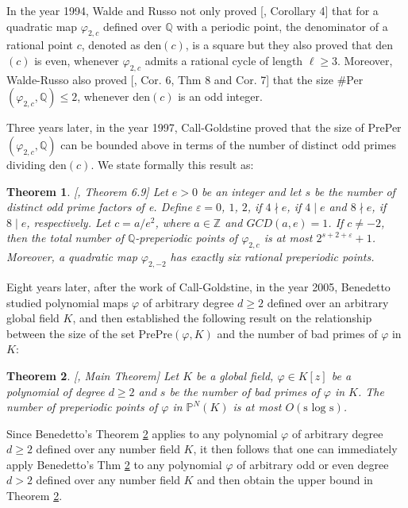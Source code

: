 \documentclass{article}
\theoremstyle{plain}
\newtheorem{thm}{Theorem}[section]
\theoremstyle{definition}
\begin{document}
In the year 1994, Walde and Russo not only proved [\cite{Russo}, Corollary 4] that for a quadratic map $\varphi_{2,c}$ defined over $\mathbb{Q}$ with a periodic point, the denominator of a rational point $c$, denoted as den$(c)$, is a square but they also proved that den$(c)$ is even, whenever $\varphi_{2,c}$ admits a rational cycle of length $\ell \geq 3$. Moreover, Walde-Russo also proved [\cite{Russo}, Cor. 6, Thm 8 and Cor. 7] that the size \#Per$(\varphi_{2, c}, \mathbb{Q})\leq 2$, whenever den$(c)$ is an odd integer. 

Three years later, in the year 1997, Call-Goldstine \cite{Call} proved that the size of PrePer$(\varphi_{2,c},\mathbb{Q})$ can be bounded above in terms of the number of distinct odd primes dividing den$(c)$. We state formally this result as:

\begin{thm}\label{2.3.1}[\cite{Call}, Theorem 6.9]
Let $e>0$ be an integer and let $s$ be the number of distinct odd prime factors of e. Define $\varepsilon  = 0$, $1$, $2$, if $4\nmid e$, if $4\mid e$ and $8 \nmid e$, if $8 \mid e$, respectively. Let $c = a/e^2$, where $a\in \mathbb{Z}$ and $GCD(a, e) = 1$. If $c \neq -2$, then the total number of $\mathbb{Q}$-preperiodic points of $\varphi_{2, c}$ is at most $2^{s + 2 + \varepsilon} + 1$. Moreover, a quadratic map $\varphi_{2, -2}$ has exactly six rational preperiodic points.
\end{thm}

Eight years later, after the work of Call-Goldstine, in the year 2005, Benedetto \cite{detto} studied polynomial maps $\varphi$ of arbitrary degree $d\geq 2$ defined over an arbitrary global field $K$, and then established the following result on the relationship between the size of the set PrePre$(\varphi, K)$ and the number of bad primes of $\varphi$ in $K$:

\begin{thm}\label{main} [\cite{detto}, Main Theorem]
Let $K$ be a global field, $\varphi\in K[z]$ be a polynomial of degree $d\geq 2$ and $s$ be the number of bad primes of $\varphi$ in $K$. The number of preperiodic points of $\varphi$ in $\mathbb{P}^N(K)$ is at most $O(\text{s log s})$. 
\end{thm}

 
\noindent Since Benedetto's Theorem \ref{main} applies to any polynomial $\varphi$ of arbitrary degree $d\geq 2$ defined over any number field $K$, it then follows that one can immediately apply Benedetto's Thm \ref{main} to any polynomial $\varphi$ of arbitrary odd or even degree $d> 2$ defined over any number field $K$ and then obtain the upper bound in Theorem \ref{main}. 
\end{document}
